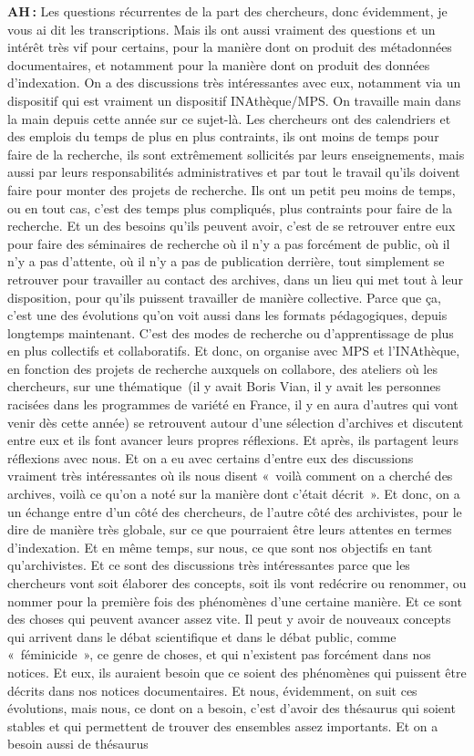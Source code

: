\textbf{AH :} Les questions récurrentes de la part des chercheurs, donc évidemment, je vous ai dit les transcriptions. Mais ils ont aussi vraiment des questions et un intérêt très vif pour certains, pour la manière dont on produit des métadonnées documentaires, et notamment pour la manière dont on produit des données d'indexation. On a des discussions très intéressantes avec eux, notamment via un dispositif qui est vraiment un dispositif INAthèque/MPS. On travaille main dans la main depuis cette année sur ce sujet-là. Les chercheurs ont des calendriers et des emplois du temps de plus en plus contraints, ils ont moins de temps pour faire de la recherche, ils sont extrêmement sollicités par leurs enseignements, mais aussi par leurs responsabilités administratives et par tout le travail qu'ils doivent faire pour monter des projets de recherche.  Ils ont un petit peu moins de temps, ou en tout cas, c'est des temps plus compliqués, plus contraints pour faire de la recherche.  Et un des besoins qu'ils peuvent avoir, c'est de se retrouver entre eux pour faire des séminaires de recherche où il n'y a pas forcément de public, où il n'y a pas d'attente, où il n'y a pas de publication derrière, tout simplement se retrouver pour travailler au contact des archives, dans un lieu qui met tout à leur disposition, pour qu'ils puissent travailler de manière collective.  Parce que ça, c'est une des évolutions qu'on voit aussi dans les formats pédagogiques, depuis longtemps maintenant. C'est des modes de recherche ou d'apprentissage de plus en plus collectifs et collaboratifs. Et donc, on organise avec MPS et l’INAthèque, en fonction des projets de recherche auxquels on collabore, des ateliers où les chercheurs, sur une thématique (il y avait Boris Vian, il y avait les personnes racisées dans les programmes de variété en France, il y en aura d'autres qui vont venir dès cette année) se retrouvent autour d'une sélection d'archives et discutent entre eux et ils font avancer leurs propres réflexions. Et après, ils partagent leurs réflexions avec nous.  Et on a eu avec certains d'entre eux des discussions vraiment très intéressantes où ils nous disent « voilà comment on a cherché des archives, voilà ce qu'on a noté sur la manière dont c'était décrit ».  Et donc, on a un échange entre d'un côté des chercheurs, de l'autre côté des archivistes, pour le dire de manière très globale, sur ce que pourraient être leurs attentes en termes d'indexation. Et en même temps, sur nous, ce que sont nos objectifs en tant qu'archivistes.  Et ce sont des discussions très intéressantes parce que les chercheurs vont soit élaborer des concepts, soit ils vont redécrire ou renommer, ou nommer pour la première fois des phénomènes d'une certaine manière.  Et ce sont des choses qui peuvent avancer assez vite. Il peut y avoir de nouveaux concepts qui arrivent dans le débat scientifique et dans le débat public, comme « féminicide », ce genre de choses, et qui n'existent pas forcément dans nos notices. Et eux, ils auraient besoin que ce soient des phénomènes qui puissent être décrits dans nos notices documentaires. Et nous, évidemment, on suit ces évolutions, mais nous, ce dont on a besoin, c'est d'avoir des thésaurus qui soient stables et qui permettent de trouver des ensembles assez importants. Et on a besoin aussi de thésaurus 